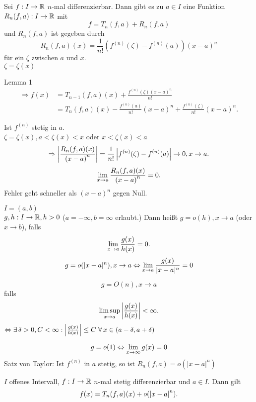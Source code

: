 \documentclass[../ana2.tex]{subfiles}
\begin{document}
\begin{satz}[Taylor]
    Sei \( f:I\rightarrow \mathbb{R} \) \( n \)-mal differenzierbar. Dann gibt es zu
    \( a \in I \) eine Funktion \( R_n(f,a):I\rightarrow \mathbb{R} \) mit
    \[ f = T_n(f, a) + R_n(f,a) \]
    und \( R_n(f,a) \) ist gegeben durch
    \[ R_n(f,a)(x) = \frac{1}{n!} 
    \left( f^{(n)}(\zeta) - f^{(n)}(a) \right) {(x-a)}^n \]
    für ein \( \zeta \) zwischen \( a \) und \( x \). \\
    \( \zeta = \zeta(x) \)
\end{satz}
\begin{bew}
    Lemma 1
    \begin{align*}
        \Rightarrow f(x) &= T_{n-1}(f, a)(x) +
        \frac{ f^{(n)}(\zeta){(x-a)}^n }{ n! } \\
        &= T_n(f,a)(x) - \frac{ f^{(n)}(a) }{n!} {(x-a)}^n 
        + \frac{f^{(n)}(\zeta)}{n!} {(x-a)}^n.
    \end{align*}
\end{bew}
\begin{bem}
    Ist \( f^{(n)} \) stetig in \( a \). \\
    \( \zeta = \zeta(x), a < \zeta(x) < x \) oder \( x < \zeta(x) < a \)
    \[ \Rightarrow \left| \frac{ R_n(f,a)(x) }{ {(x-a)}^n } \right| 
    = \frac{1}{n!} \left| f^{(n)}(\zeta) - f^{(n)}(a) \right| 
    \rightarrow 0, x \rightarrow a. \]
    \[ \lim\limits_{x\rightarrow{}a} \frac{ R_n(f,a)(x) }{ {(x-a)}^n } = 0. \]
    Fehler geht schneller als \( {(x-a)}^n \) gegen Null.
\end{bem}
\begin{defi}
    \( I = (a,b) \) \\
    \( g,h:I\rightarrow \mathbb{R}, h > 0\) (\(a=-\infty, b=\infty \) erlaubt.)
    Dann heißt \( g = o(h), x \rightarrow a \) 
    (oder \( x \rightarrow b \)), falls 
    \[ \lim\limits_{x\rightarrow{}a} \frac{g(x)}{h(x)} = 0. \]
    \zB{} \[ g = o(|x-a|^n), x \rightarrow a 
    \Leftrightarrow \lim\limits_{x\rightarrow{}a} 
    \frac{g(x)}{|x-a|^n} = 0 \]

    \[ g = O(n), x \rightarrow a \]
    falls \[ \limsup\limits_{x\rightarrow{}a} \left|\frac{g(x)}{h(x)}\right| < \infty. \]
    \( \Leftrightarrow \exists \delta > 0, C < \infty: 
    \abs{ \frac{g(x)}{h(x)} } \leq C 
    \;\forall x \in (a - \delta, a + \delta) \)

    \[ g = o(1) \Leftrightarrow \lim\limits_{x\rightarrow\infty} g(x) = 0 \]
    Satz von Taylor: Ist \( f^{(n)} \) in \( a \) stetig, so ist
    \( R_n(f,a) = o(|x-a|^n) \)
\end{defi}
\begin{kor}
    \(I\) offenes Intervall, \( f:I\rightarrow \mathbb{R} \) 
    \(n\)-mal stetig differenzierbar und \(a\in I\). 
    Dann gilt 
    \[ f(x) = T_n(f,a)(x) + o(\left|x-a\right|^n). \]
\end{kor}
\end{document}
